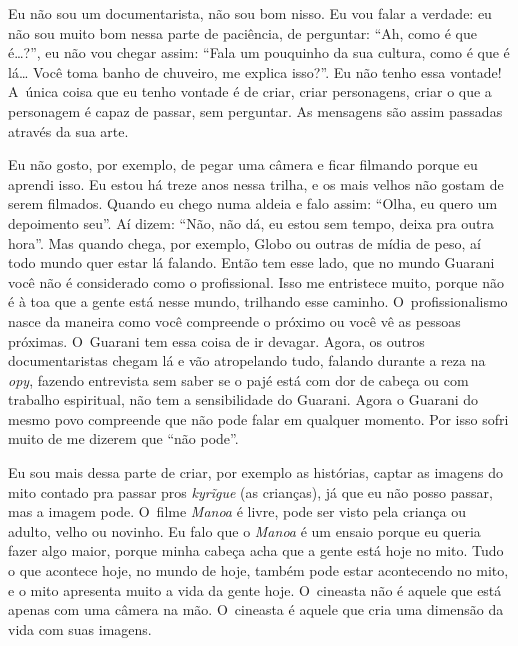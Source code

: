 Eu não sou um documentarista, não sou bom nisso. Eu vou falar a verdade:
eu não sou muito bom nessa parte de paciência, de perguntar: ``Ah, como
é que é\ldots{}?'', eu não vou chegar assim: ``Fala um pouquinho da sua
cultura, como é que é lá\ldots{} Você toma banho de chuveiro, me explica
isso?''. Eu não tenho essa vontade! A~única coisa que eu tenho vontade é
de criar, criar personagens, criar o que a personagem é capaz de
passar, sem perguntar. As mensagens são assim passadas através da sua
arte. 

Eu não gosto, por exemplo, de pegar uma câmera e ficar filmando porque
eu aprendi isso. Eu estou há treze anos nessa trilha, e os mais velhos
não gostam de serem filmados. Quando eu chego numa aldeia e falo assim:
``Olha, eu quero um depoimento seu''. Aí dizem: ``Não, não dá, eu estou
sem tempo, deixa pra outra hora''. Mas quando chega, por exemplo, Globo
ou outras de mídia de peso, aí todo mundo quer estar lá falando. Então
tem esse lado, que no mundo Guarani você não é considerado como o
profissional. Isso me entristece muito, porque não é à toa que a gente
está nesse mundo, trilhando esse caminho. O~profissionalismo nasce da
maneira como você compreende o próximo ou você vê as pessoas próximas.
O~Guarani tem essa coisa de ir devagar. Agora, os outros
documentaristas chegam lá e vão atropelando tudo, falando durante a
reza na \emph{opy}, fazendo entrevista sem saber se o pajé está com dor de
cabeça ou com trabalho espiritual, não tem a sensibilidade do Guarani.
Agora o Guarani do mesmo povo compreende que não pode falar em qualquer
momento. Por isso sofri muito de me dizerem que ``não pode''.

Eu sou mais dessa parte de criar, por exemplo as histórias, captar as
imagens do mito contado pra passar pros \emph{kyrĩgue} (as
crianças), já que eu não posso passar, mas a imagem pode. O~filme \emph{Manoa}
é livre, pode ser visto pela criança ou adulto, velho ou novinho. Eu
falo que o \emph{Manoa} é um ensaio porque eu queria fazer algo maior, porque
minha cabeça acha que a gente está hoje no mito. Tudo o que acontece
hoje, no mundo de hoje, também pode estar acontecendo no mito, e o mito
apresenta muito a vida da gente hoje. O~cineasta não é aquele que está
apenas com uma câmera na mão. O~cineasta é aquele que cria uma dimensão
da vida com suas imagens.

\clearpage

\vspace*{\fill}

